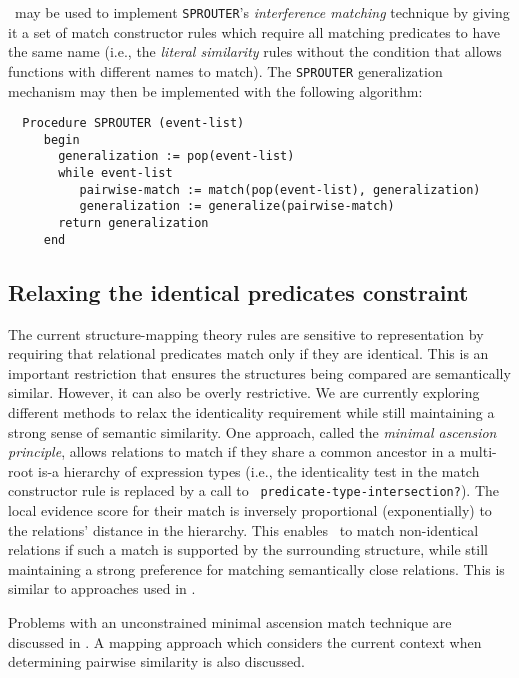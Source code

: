 \SME\ may be used to implement {\tt SPROUTER}'s {\it interference matching}
technique by giving it a set of match constructor rules which require all
matching predicates to have the same name (i.e., the {\it literal
similarity} rules without the condition that allows functions with different
names to match). The {\tt SPROUTER} generalization
mechanism may then be implemented with the following algorithm:

\begin{small}
\begin{verbatim}
  Procedure SPROUTER (event-list)
     begin
       generalization := pop(event-list)
       while event-list
          pairwise-match := match(pop(event-list), generalization)
          generalization := generalize(pairwise-match)
       return generalization
     end
\end{verbatim}
\end{small}


\subsection{Relaxing the identical predicates constraint}

The current structure-mapping theory rules are sensitive to representation
by requiring that relational predicates match only if they are identical.
This is an important restriction that ensures the structures being compared
are semantically similar. However, it can also be overly restrictive.  We
are currently exploring different methods to relax the identicality
requirement while still maintaining a strong sense of semantic similarity.
One approach, called the {\it minimal ascension principle}, allows relations
to match if they share a common ancestor in a multi-root is-a hierarchy of
expression types \cite{Falken-phd} (i.e., the identicality test in the match
constructor rule is replaced by a call to {\tt
predicate-type-intersection?}). The local evidence score for their match is
inversely proportional (exponentially) to the relations' distance in the
hierarchy.  This enables \SME\ to match non-identical relations if such a
match is supported by the surrounding structure, while still maintaining a
strong preference for matching semantically close relations. This is similar
to approaches used in \cite{Burstein83,Greiner,Winston80}.

Problems with an unconstrained minimal ascension match technique are
discussed in \cite{Falken-phd}. A mapping approach which considers the
current context when determining pairwise similarity is also discussed.

